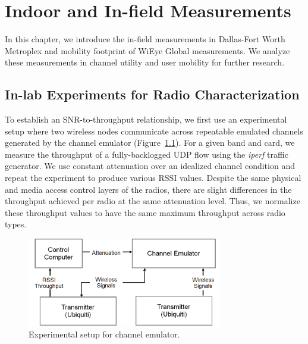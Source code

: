 \chapter{Indoor and In-field Measurements} 
\label{ch:measurements}

In this chapter, we introduce the in-field measurements in Dallas-Fort Worth 
Metroplex and mobility footprint of WiEye Global measurements. 
We analyze these measurements in channel utility and user mobility for 
further research.


\section{In-lab Experiments for Radio Characterization}
\label{subsec:ichannel}
To establish an SNR-to-throughput relationship, we first use an experimental setup where two 
wireless nodes communicate across repeatable emulated channels generated 
by the channel emulator (Figure~\ref{fig:in-door experiment}). For a given band and card, we measure
the throughput of a fully-backlogged UDP flow using the {\it iperf} 
traffic generator. We use constant attenuation over an idealized
channel condition and repeat the experiment to
produce various RSSI values.
Despite the same physical and media access control layers of the radios, there are
slight differences in the throughput achieved per radio at the same attenuation
level.  Thus, we normalize these throughput values to have the same maximum
throughput across radio types.

\begin{figure} [h]
\centering
\includegraphics[width=85mm]{figures/emulator2}
\caption{Experimental setup for channel emulator.}
\label{fig:in-door experiment}
\vspace{-0.1in}
\end{figure}





